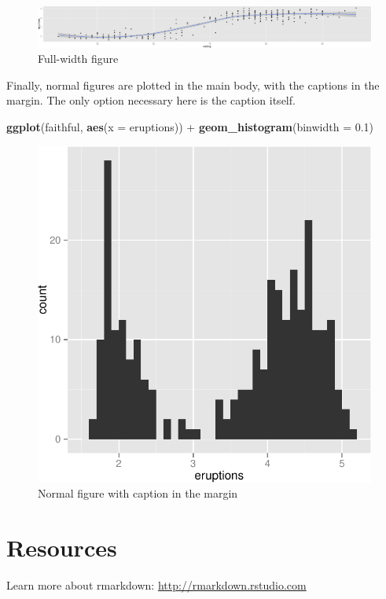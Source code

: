 \documentclass{tufte-handout}
\newenvironment{Shaded}{}{}
\newcommand{\KeywordTok}[1]{\textcolor[rgb]{0.00,0.44,0.13}{\textbf{{#1}}}}
\newcommand{\DataTypeTok}[1]{\textcolor[rgb]{0.56,0.13,0.00}{{#1}}}
\newcommand{\FloatTok}[1]{\textcolor[rgb]{0.25,0.63,0.44}{{#1}}}
\newcommand{\StringTok}[1]{\textcolor[rgb]{0.25,0.44,0.63}{{#1}}}
\newcommand{\NormalTok}[1]{{#1}}
\begin{document}
\begin{figure}
 \includegraphics{./pindex_files/figure-latex/fig2}
\caption{ Full-width figure }
\end{figure}

Finally, normal figures are plotted in the main body, with the captions
in the margin. The only option necessary here is the caption itself.

\begin{Shaded}
\begin{Highlighting}[]
\KeywordTok{ggplot}\NormalTok{(faithful, }\KeywordTok{aes}\NormalTok{(}\DataTypeTok{x =} \NormalTok{eruptions)) +}\StringTok{ }\KeywordTok{geom_histogram}\NormalTok{(}\DataTypeTok{binwidth =} \FloatTok{0.1}\NormalTok{)}
\end{Highlighting}
\end{Shaded}

\begin{figure}
 \includegraphics{./pindex_files/figure-latex/fig3}
\caption{ Normal figure with caption in the margin }
\end{figure}

\section{Resources}\label{resources}

Learn more about rmarkdown: \url{http://rmarkdown.rstudio.com}
\end{document}
